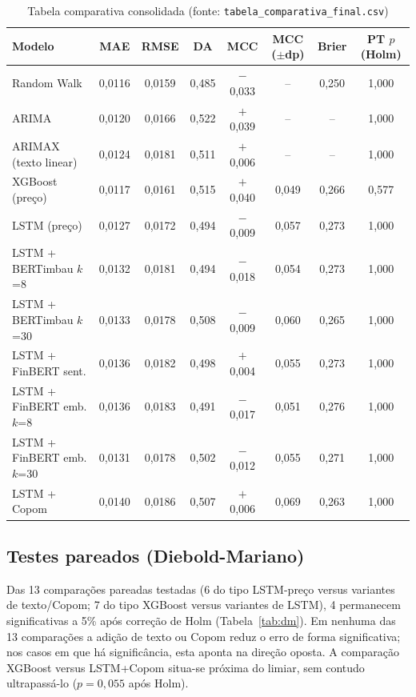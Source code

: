 \documentclass[conference]{IEEEtran}
\begin{document}
\begin{table}[htbp]
\caption{Tabela comparativa consolidada (fonte: \texttt{tabela\_comparativa\_final.csv})}
\begin{center}
\begin{tabular}{lccccccc}
\toprule
\textbf{Modelo} & \textbf{MAE} & \textbf{RMSE} & \textbf{DA} & \textbf{MCC} & \textbf{MCC ($\pm$dp)} & \textbf{Brier} & \textbf{PT $p$ (Holm)} \\
\midrule
Random Walk            & 0,0116 & 0,0159 & 0,485 & $-$0,033 & --      & 0,250 & 1,000 \\
ARIMA                   & 0,0120 & 0,0166 & 0,522 & $+$0,039 & --      & --    & 1,000 \\
ARIMAX (texto linear)   & 0,0124 & 0,0181 & 0,511 & $+$0,006 & --      & --    & 1,000 \\
XGBoost (pre\c{c}o)     & 0,0117 & 0,0161 & 0,515 & $+$0,040 & 0,049   & 0,266 & 0,577 \\
LSTM (pre\c{c}o)        & 0,0127 & 0,0172 & 0,494 & $-$0,009 & 0,057   & 0,273 & 1,000 \\
LSTM + BERTimbau $k$=8  & 0,0132 & 0,0181 & 0,494 & $-$0,018 & 0,054   & 0,273 & 1,000 \\
LSTM + BERTimbau $k$=30 & 0,0133 & 0,0178 & 0,508 & $-$0,009 & 0,060   & 0,265 & 1,000 \\
LSTM + FinBERT sent.    & 0,0136 & 0,0182 & 0,498 & $+$0,004 & 0,055   & 0,273 & 1,000 \\
LSTM + FinBERT emb. $k$=8  & 0,0136 & 0,0183 & 0,491 & $-$0,017 & 0,051 & 0,276 & 1,000 \\
LSTM + FinBERT emb. $k$=30 & 0,0131 & 0,0178 & 0,502 & $-$0,012 & 0,055 & 0,271 & 1,000 \\
LSTM + Copom            & 0,0140 & 0,0186 & 0,507 & $+$0,006 & 0,069   & 0,263 & 1,000 \\
\bottomrule
\end{tabular}
\label{tab:comparativa}
\end{center}
\end{table}

\subsection{Testes pareados (Diebold-Mariano)}

Das 13 compara\c{c}\~oes pareadas testadas (6 do tipo LSTM-pre\c{c}o versus variantes de texto/Copom; 7 do tipo XGBoost versus variantes de LSTM), 4 permanecem significativas a 5\% ap\'os corre\c{c}\~ao de Holm (Tabela~\ref{tab:dm}). Em nenhuma das 13 compara\c{c}\~oes a adi\c{c}\~ao de texto ou Copom reduz o erro de forma significativa; nos casos em que h\'a signific\^ancia, esta aponta na dire\c{c}\~ao oposta. A compara\c{c}\~ao XGBoost versus LSTM+Copom situa-se pr\'oxima do limiar, sem contudo ultrapass\'a-lo ($p=0,055$ ap\'os Holm).
\end{document}
